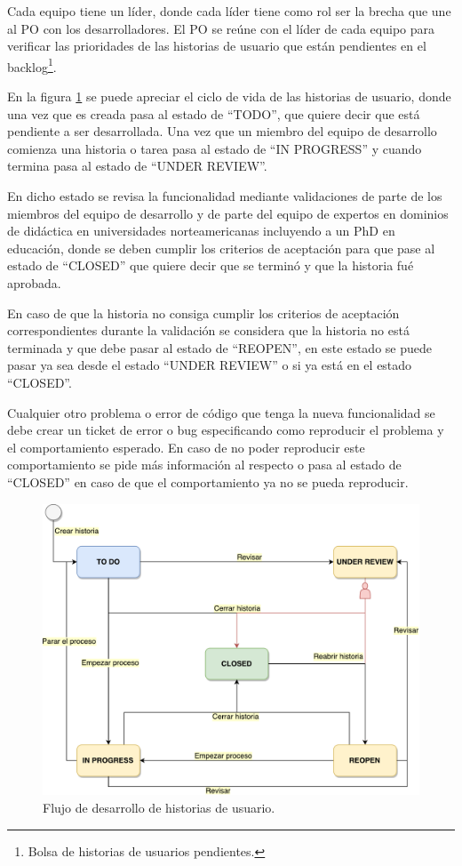 Cada equipo tiene un líder, donde cada líder tiene como rol ser la brecha que une al PO con los desarrolladores. El PO se reúne con el líder de cada equipo para verificar las prioridades de las historias de usuario que están pendientes en el backlog\footnote{Bolsa de historias de usuarios pendientes.}. 

En la figura \ref{workflow} se puede apreciar el ciclo de vida de las historias de usuario, donde una vez que es creada pasa al estado de \enquote{TODO}, que quiere decir que está pendiente a ser desarrollada. Una vez que un miembro del equipo de desarrollo comienza una historia o tarea pasa al estado de \enquote{IN PROGRESS} y cuando termina pasa al estado de \enquote{UNDER REVIEW}. 

En dicho estado se revisa la funcionalidad mediante validaciones de parte de los miembros del equipo de desarrollo y de parte del equipo de expertos en dominios de didáctica en universidades norteamericanas incluyendo a un PhD en educación, donde se deben cumplir los criterios de aceptación para que pase al estado de \enquote{CLOSED} que quiere decir que se terminó y que la historia fué aprobada.  

En caso de que la historia no consiga cumplir los criterios de aceptación correspondientes durante la validación se considera que la historia no está terminada y que debe pasar al estado de \enquote{REOPEN}, en este estado se puede pasar ya sea desde el estado \enquote{UNDER REVIEW} o si ya está en el estado \enquote{CLOSED}.

Cualquier otro problema o error de código que tenga la nueva funcionalidad se debe crear un ticket de error o bug especificando como reproducir el problema y el comportamiento esperado. En caso de no poder reproducir este comportamiento se pide más información al respecto o pasa al estado de \enquote{CLOSED} en caso de que el comportamiento ya no se pueda reproducir.

\begin{figure}[]
\centering
\includegraphics[width=125mm,scale=1]{Figuras/workflow}
\caption{Flujo de desarrollo de historias de usuario.}
  \label{workflow}
\end{figure}

